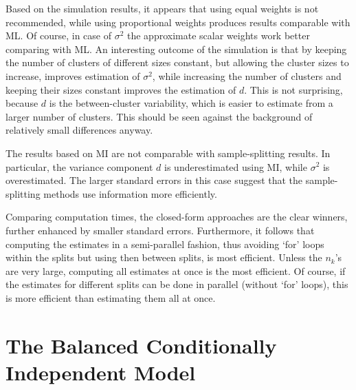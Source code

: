 \documentclass[11pt,a5paper,twoside]{book}
\begin{document}
{Based on the simulation results, it appears that  using equal weights is not recommended, while using proportional weights produces results comparable with ML. Of course, in case of $\sigma^2$ the approximate scalar weights  work better comparing with ML. An interesting outcome of the simulation is that by keeping the number of clusters of different sizes constant, but allowing the cluster sizes to increase, improves estimation of  $\sigma^2$, while increasing the number of clusters and keeping their sizes constant improves the estimation of  $d$. This is not surprising, because $d$ is the between-cluster variability, which is easier to estimate from a larger number of clusters. This should be seen against the background of relatively small differences anyway. 

The results based on MI are not comparable with sample-splitting results. In particular, the variance component $d$ is underestimated using MI, while $\sigma^2$ is overestimated.  The larger standard errors in this case suggest that the sample-splitting methods use information more efficiently. 

Comparing computation times, the closed-form approaches are the clear winners, further enhanced by smaller standard errors.  Furthermore, it follows that computing the estimates in a semi-parallel fashion, thus avoiding `for' loops within the splits but using then  between splits, is most efficient. Unless the $n_k$'s are very large, computing all  estimates at once is the most efficient. Of course, if the estimates for different splits can be done in parallel (without `for' loops), this is more efficient than estimating them all at once.



\section{The Balanced Conditionally Independent Model\label{bcim}}

}
\end{document}

